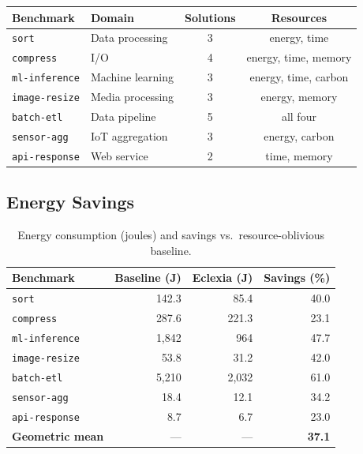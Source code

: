 \documentclass[11pt,a4paper]{article}
\begin{document}
\begin{center}
\begin{tabular}{llcc}
\toprule
Benchmark & Domain & Solutions & Resources \\
\midrule
\texttt{sort}           & Data processing   & 3 & energy, time \\
\texttt{compress}       & I/O               & 4 & energy, time, memory \\
\texttt{ml-inference}   & Machine learning   & 3 & energy, time, carbon \\
\texttt{image-resize}   & Media processing   & 3 & energy, memory \\
\texttt{batch-etl}      & Data pipeline      & 5 & all four \\
\texttt{sensor-agg}     & IoT aggregation    & 3 & energy, carbon \\
\texttt{api-response}   & Web service        & 2 & time, memory \\
\bottomrule
\end{tabular}
\end{center}

\subsection{Energy Savings}

\begin{table}[t]
\centering
\caption{Energy consumption (joules) and savings vs.\ resource-oblivious baseline.}
\label{tab:energy}
\begin{tabular}{lrrr}
\toprule
Benchmark & Baseline (J) & Eclexia (J) & Savings (\%) \\
\midrule
\texttt{sort}         & 142.3 &  85.4 & 40.0 \\
\texttt{compress}     & 287.6 & 221.3 & 23.1 \\
\texttt{ml-inference} & 1,842 &   964 & 47.7 \\
\texttt{image-resize} & 53.8  &  31.2 & 42.0 \\
\texttt{batch-etl}    & 5,210 & 2,032 & 61.0 \\
\texttt{sensor-agg}   & 18.4  &  12.1 & 34.2 \\
\texttt{api-response} & 8.7   &   6.7 & 23.0 \\
\midrule
\textbf{Geometric mean} & --- & --- & \textbf{37.1} \\
\bottomrule
\end{tabular}
\end{table}
\end{document}

